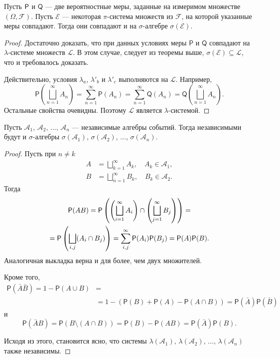 \begin{lemma}
  Пусть $ \mathsf P $ и $ \mathsf Q $ --- две вероятностные меры, заданные на
  измеримом множестве $ (\Omega, \mathscr F) $. Пусть $ \mathscr E $ ---
  некоторая $ \pi $-система множеств из $ \mathscr F $, на которой указанные
  меры совпадают. Тогда они совпадают и на $ \sigma $-алгебре $ \sigma(\mathscr
  E)$.
\end{lemma}
\begin{proof}
  Достаточно доказать, что при данных условиях меры $ \mathsf P $ и $ \mathsf Q
  $ совпадают на $ \lambda $-системе множеств $ \mathscr L $. В этом случае,
  следует из теоремы выше, $ \sigma(\mathscr E) \subseteq \mathscr L $, что и
  требовалось доказать.

  Действительно, условия $ \lambda_a $, $ \lambda'_b $ и $ \lambda'_c $
  выполняются на $ \mathscr L $. Например, 
  \[
    \mathsf P\left(\bigsqcup_{n=1}^\infty A_n\right) = \sum_{n=1}^\infty \mathsf P(A_n) =
    \sum_{n=1}^\infty \mathsf Q(A_n) = \mathsf Q\left(\bigsqcup_{n=1}^\infty A_n\right).
  \]
  Остальные свойства очевидны. Поэтому $ \mathscr L $ является $ \lambda
  $-системой.
\end{proof}

\begin{lemma}
  Пусть $ \mathscr A_1,\, \mathscr A_2,\, \ldots,\, \mathscr A_n $ --- независимые
  алгебры событий. Тогда независимыми будут и $ \sigma $-алгебры $ \sigma(\mathscr
  A_1)$, $ \sigma(\mathscr A_2) $, $ \ldots $, $ \sigma(\mathscr A_n) $.
\end{lemma}
\begin{proof}
  Пусть при $ n \neq k $
  \begin{align*}
    A &= \bigsqcup_{k=1}^\infty A_k, \quad A_k \in \mathscr A_1,\\
    B &= \bigsqcup_{n=1}^\infty B_k, \quad B_k \in \mathscr A_2.
  \end{align*}
  Тогда
  \begin{multline*}
    \mathsf P(AB) = \mathsf P \left( \left(\bigsqcup_{i=1}^\infty
      A_i\right) \cap \left( \bigsqcup_{j=1}^\infty B_j \right) 
    \right) =\\= \mathsf P \left( \bigsqcup_{i, j} (A_i \cap B_j) \right) =
    \sum_{i, j}^\infty \mathsf P(A_i)\mathsf P(B_j) =
    \mathsf P(A) \mathsf P(B).
  \end{multline*}
  Аналогичная выкладка верна и для более, чем двух множителей.

Кроме того, 
\begin{align*}
  \mathsf P(\bar A \bar B) = 1 - \mathsf P(A \cup B) &=\\&=
    1 - \left( \mathsf P(B)
    + \mathsf P(A) - \mathsf P(A\cap B)\right)  = \mathsf P(\bar A)
    \mathsf P(\bar B)
\end{align*}
и 
\[
    \mathsf P(\bar A B) = \mathsf P(B\setminus (A\cap B)) =\mathsf P(B) -
    \mathsf P(AB) = \mathsf P(\bar A)\mathsf P(B).
\]

Исходя из этого, становится ясно, что системы $ \lambda(\mathscr A_1),\,
\lambda(\mathscr A_2),\, \ldots,\, \lambda(\mathscr A_n) $ также независимы.
\end{proof} %




  

 






